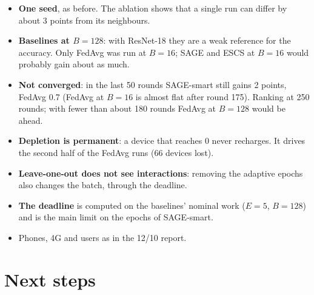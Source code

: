 \documentclass[11pt,a4paper]{article}
\begin{document}
\begin{itemize}
  \item \textbf{One seed}, as before. The ablation shows that a single run can
        differ by about 3 points from its neighbours.
  \item \textbf{Baselines at $B=128$}: with ResNet-18 they are a weak reference
        for the accuracy. Only FedAvg was run at $B=16$; SAGE and ESCS at
        $B=16$ would probably gain about as much.
  \item \textbf{Not converged}: in the last 50 rounds SAGE-smart still gains 2
        points, FedAvg 0.7 (FedAvg at $B=16$ is almost flat after round 175).
        Ranking at 250 rounds; with fewer than about 180 rounds FedAvg at
        $B=128$ would be ahead.
  \item \textbf{Depletion is permanent}: a device that reaches 0 never
        recharges. It drives the second half of the FedAvg runs (66 devices
        lost).
  \item \textbf{Leave-one-out does not see interactions}: removing the adaptive
        epochs also changes the batch, through the deadline.
  \item \textbf{The deadline} is computed on the baselines' nominal work ($E=5$,
        $B=128$) and is the main limit on the epochs of SAGE-smart.
  \item Phones, 4G and users as in the 12/10 report.
\end{itemize}

\section{Next steps}
\end{document}
